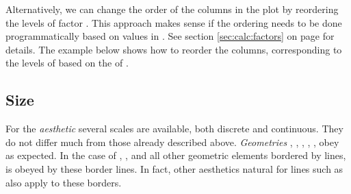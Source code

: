 \documentclass[krantz2]{krantz}\usepackage{knitr}%
\begin{document}
\begin{knitrout}\footnotesize
{}\color{fgcolor}\begin{kframe}
\begin{alltt}
  \hlstd{(} \hlstd{=} \hlstd{(}\hlstd{,} \hlstd{,} \hlstd{),}
                    
\end{alltt}
\end{kframe}
\end{knitrout}

Alternatively, we can change the order of the columns in the plot by reordering the levels of factor . This approach makes sense if the ordering needs to be done programmatically based on values in . See section \ref{sec:calc:factors} on page \pageref{sec:calc:factors} for details. The example below shows how to reorder the columns, corresponding to the levels of  based on the  of .

\begin{knitrout}\footnotesize
{}\color{fgcolor}\begin{kframe}
\begin{alltt}
 \hlstd{(}\hlstd{(} \hlstd{=}      \hlopt{+}
  \hlstd{(} \hlstd{=} \hlstd{,}  
\end{alltt}
\end{kframe}
\end{knitrout}

\subsection{Size}
For the  \emph{aesthetic} several scales are available, both discrete and continuous. They do not differ much from those already described above. \emph{Geometries} , , , , ,  obey  as expected. In the case of , ,  and all other geometric elements bordered by lines,  is obeyed by these border lines. In fact, other aesthetics natural for lines such as  also apply to these borders.
\end{document}
